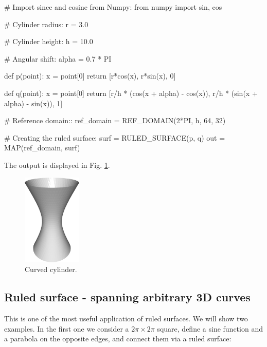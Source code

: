 \begin{bluecode}
# Import since and cosine from Numpy:
from numpy import sin, cos

# Cylinder radius:
r = 3.0

# Cylinder height:
h = 10.0

# Angular shift:
alpha = 0.7 * PI

def p(point):
    x = point[0]
    return [r*cos(x), r*sin(x), 0]
  
def q(point):
    x = point[0]
    return [r/h * (cos(x + alpha) - cos(x)), r/h * (sin(x + alpha) 
           - sin(x)), 1]

# Reference domain::  
ref_domain = REF_DOMAIN(2*PI, h, 64, 32)

# Creating the ruled surface:
surf = RULED_SURFACE(p, q)
out = MAP(ref_domain, surf)
\end{bluecode}
The output is displayed in Fig. \ref{fig:curves-9}.
\newpage

\begin{figure}[!ht]
\begin{center}
\includegraphics[width=0.25\textwidth]{img/curves-9.png}
\end{center}
\vspace{-4mm}
\caption{Curved cylinder.}
\label{fig:curves-9}
\end{figure}

\subsection{Ruled surface - spanning arbitrary 3D curves}

This is one of the most useful application of ruled surfaces.
We will show two examples. In the first one we consider 
a $2\pi \times 2\pi$ square, define a sine function and 
a parabola on the opposite edges, and connect them via 
a ruled surface:


